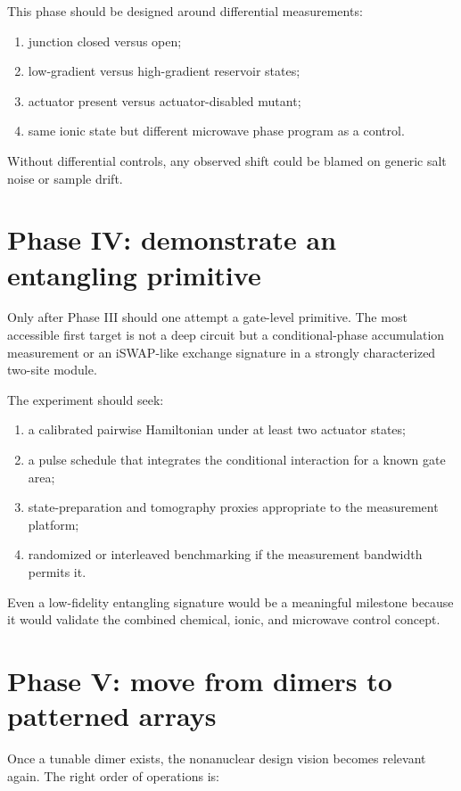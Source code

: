 \documentclass[11pt]{report}
\newcommand{\ham}{Hamiltonian}
\theoremstyle{definition}
\begin{document}
This phase should be designed around differential measurements:

\begin{enumerate}[leftmargin=2em]
\item junction closed versus open;
\item low-gradient versus high-gradient reservoir states;
\item actuator present versus actuator-disabled mutant;
\item same ionic state but different microwave phase program as a control.
\end{enumerate}

Without differential controls, any observed shift could be blamed on generic salt noise or sample drift.

\section{Phase IV: demonstrate an entangling primitive}
Only after Phase III should one attempt a gate-level primitive. The most accessible first target is not a deep circuit but a conditional-phase accumulation measurement or an iSWAP-like exchange signature in a strongly characterized two-site module.

The experiment should seek:

\begin{enumerate}[leftmargin=2em]
\item a calibrated pairwise \ham{} under at least two actuator states;
\item a pulse schedule that integrates the conditional interaction for a known gate area;
\item state-preparation and tomography proxies appropriate to the measurement platform;
\item randomized or interleaved benchmarking if the measurement bandwidth permits it.
\end{enumerate}

Even a low-fidelity entangling signature would be a meaningful milestone because it would validate the combined chemical, ionic, and microwave control concept.

\section{Phase V: move from dimers to patterned arrays}
Once a tunable dimer exists, the nonanuclear design vision becomes relevant again. The right order of operations is:
\end{document}
